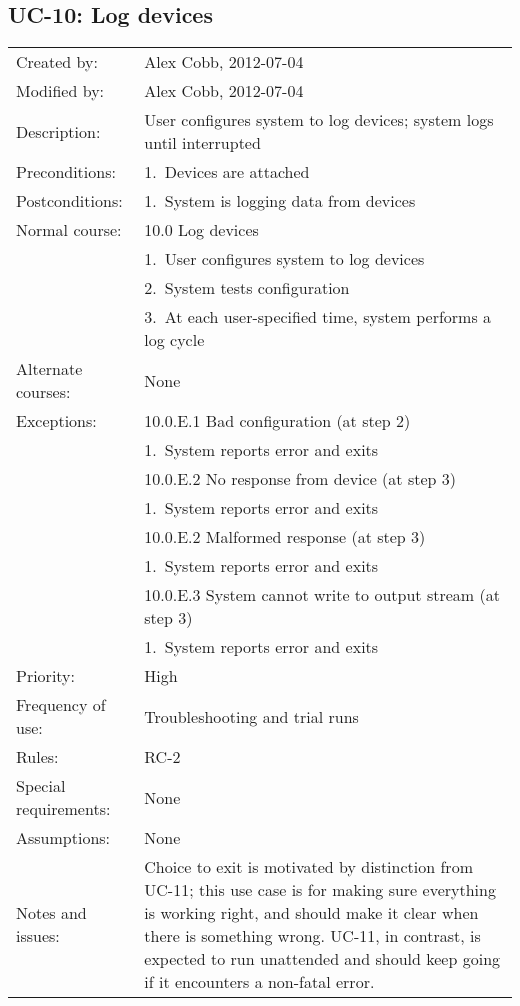 \documentclass[pdftex,oneside,12pt,a4paper]{book}
\begin{document}
\subsection{UC-10: Log devices}
\begin{tabular}{|l|p{10cm}|}\hline
Created by: & Alex Cobb, 2012-07-04 \\
Modified by: & Alex Cobb, 2012-07-04 \\\hline
Description: & User configures system to log devices; system logs until interrupted \\\hline
Preconditions: & 1.\ Devices are attached \\\hline
Postconditions: & 1.\ System is logging data from devices \\\hline
Normal course: & 10.0 Log devices\\
 & 1.\ User configures system to log devices\\
 & 2.\ System tests configuration\\
 & 3.\ At each user-specified time, system performs a log cycle\\\hline
Alternate courses: & None\\
Exceptions: & 10.0.E.1 Bad configuration (at step 2)\\
 & 1.\ System reports error and exits\\\cline{2-2}
 & 10.0.E.2 No response from device (at step 3) \\
 & 1.\ System reports error and exits\\\cline{2-2}
 & 10.0.E.2 Malformed response (at step 3)\\
 & 1.\ System reports error and exits\\\cline{2-2}
 & 10.0.E.3 System cannot write to output stream (at step 3) \\
 & 1.\ System reports error and exits\\\hline
Priority: & High \\\hline
Frequency of use: & Troubleshooting and trial runs\\\hline
Rules: & RC-2\\\hline
Special requirements: & None\\\hline
Assumptions: & None\\\hline
Notes and issues: & Choice to exit is motivated by distinction from UC-11; this use case is for making sure everything is working right, and should make it clear when there is something wrong.  UC-11, in contrast, is expected to run unattended and should keep going if it encounters a non-fatal error.\\\hline
\end{tabular}
\end{document}
